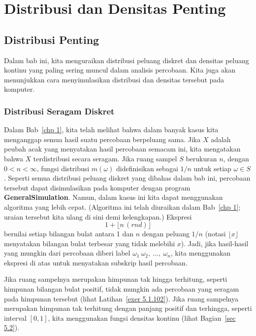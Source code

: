 {\chapter[Distribusi dan Densitas]{Distribusi dan Densitas Penting}}\label{chp 5} 

\section{Distribusi Penting}\label{sec 5.1} 

Dalam bab ini, kita menguraikan distribusi peluang diskret dan densitas peluang kontinu
yang paling sering muncul dalam analisis percobaan. Kita juga akan menunjukkan cara
menyimulasikan distribusi dan densitas tersebut pada komputer.

\subsection*{Distribusi Seragam Diskret}

Dalam Bab~\ref{chp 1}, kita telah melihat bahwa dalam banyak kasus kita menganggap semua
hasil suatu percobaan berpeluang sama. Jika $X$ adalah peubah acak yang menyatakan hasil
percobaan semacam ini, kita mengatakan bahwa $X$ terdistribusi secara seragam. Jika ruang
sampel $S$ berukuran $n$, dengan $0 < n < \infty$, fungsi distribusi $m(\omega)$
didefinisikan sebagai $1/n$ untuk setiap $\omega \in S$. Seperti semua distribusi peluang
diskret yang dibahas dalam bab ini, percobaan tersebut dapat disimulasikan pada komputer
dengan program {\bf GeneralSimulation}. Namun, dalam kasus ini kita dapat menggunakan
algoritma yang lebih cepat. (Algoritma ini telah diuraikan dalam Bab~\ref{chp 1}; uraian
tersebut kita ulang di sini demi kelengkapan.) Ekspresi
$$1 + \lfloor n\,(rnd)\rfloor$$ 
bernilai setiap bilangan bulat antara 1 dan $n$ dengan peluang $1/n$ (notasi
$\lfloor x \rfloor$ menyatakan bilangan bulat terbesar yang tidak melebihi $x$). Jadi,
jika hasil-hasil yang mungkin dari percobaan diberi label
$\omega_1\ \omega_2,\ \ldots,\ \omega_n$, kita menggunakan ekspresi di atas untuk
menyatakan subskrip hasil percobaan.
\par Jika ruang sampelnya merupakan himpunan tak hingga terhitung, seperti himpunan
bilangan bulat positif, tidak mungkin ada percobaan yang seragam pada himpunan tersebut
(lihat Latihan~\ref{exer 5.1.102}). Jika ruang sampelnya merupakan himpunan tak terhitung
dengan panjang positif dan terhingga, seperti interval $[0, 1]$, kita menggunakan fungsi
densitas kontinu (lihat Bagian~\ref{sec 5.2}).

